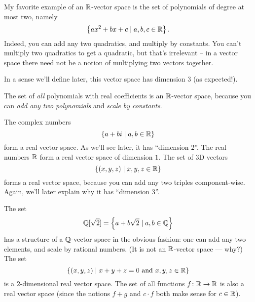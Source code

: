 \begin{example}
	My favorite example of an $\mathbb R$-vector space is the
	set of polynomials of degree at most two, namely
	\[ \left\{ ax^2+bx+c \mid a,b,c \in \mathbb R \right\}. \]
	Indeed, you can add any two quadratics, and multiply by constants.
	You can't multiply two quadratics to get a quadratic,
	but that's irrelevant -- in a vector space there need not
	be a notion of multiplying two vectors together.

	In a sense we'll define later, this vector space
	has dimension $3$ (as expected!).
	\label{ex:quadratic_vector_space}
\end{example}
\begin{example}
	The set of \emph{all} polynomials with real coefficients is an
	$\mathbb R$-vector space, because you can \emph{add any two polynomials}
	and \emph{scale by constants}.
\end{example}

\begin{example}
	\listhack
	\begin{enumerate}[(a)]
		\ii The complex numbers
		\[ \left\{ a+bi \mid a,b \in \mathbb R \right\} \]
		form a real vector space. As we'll see later,
		it has ``dimension $2$''.
		\ii The real numbers $\mathbb R$ form a real vector space of dimension $1$.
		\ii The set of 3D vectors
		\[ \left\{ (x,y,z) \mid x,y,z \in \mathbb R \right\} \]
		forms a real vector space, because you can add any two triples
		component-wise. Again, we'll later explain
		why it has ``dimension $3$''.
	\end{enumerate}
\end{example}

\begin{example}
	\listhack
	\begin{enumerate}[(a)]
		\ii The set \[ \mathbb Q[\sqrt 2] = \left\{ a + b \sqrt 2 \mid a, b \in \mathbb Q \right\} \]
		has a structure of a $\mathbb Q$-vector space in the obvious fashion:
		one can add any two elements, and scale by rational numbers.
		(It is not an $\mathbb R$-vector space --- why?)
		\ii The set \[ \left\{ (x,y,z) \mid x+y+z = 0 \text{ and } x,y,z \in \mathbb R \right\} \]
		is a $2$-dimensional real vector space.
		\ii The set of all functions $f \colon \mathbb R \to \mathbb R$ is also a real vector space
		(since the notions $f+g$ and $c \cdot f$ both make sense for $c \in \mathbb R$).
	\end{enumerate}
\end{example}

